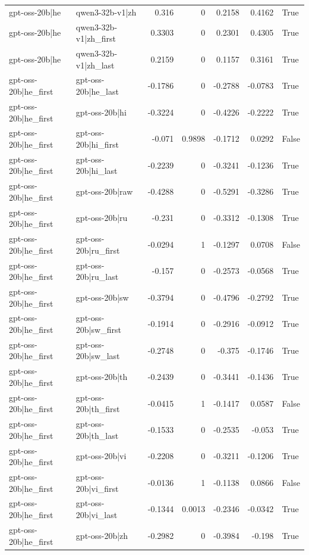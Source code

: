 \begin{table}
\begin{tabular}{l l r r r r l}
gpt-oss-20b|he & qwen3-32b-v1|zh & 0.316 & 0 & 0.2158 & 0.4162 & True \\
gpt-oss-20b|he & qwen3-32b-v1|zh_first & 0.3303 & 0 & 0.2301 & 0.4305 & True \\
gpt-oss-20b|he & qwen3-32b-v1|zh_last & 0.2159 & 0 & 0.1157 & 0.3161 & True \\
gpt-oss-20b|he_first & gpt-oss-20b|he_last & -0.1786 & 0 & -0.2788 & -0.0783 & True \\
gpt-oss-20b|he_first & gpt-oss-20b|hi & -0.3224 & 0 & -0.4226 & -0.2222 & True \\
gpt-oss-20b|he_first & gpt-oss-20b|hi_first & -0.071 & 0.9898 & -0.1712 & 0.0292 & False \\
gpt-oss-20b|he_first & gpt-oss-20b|hi_last & -0.2239 & 0 & -0.3241 & -0.1236 & True \\
gpt-oss-20b|he_first & gpt-oss-20b|raw & -0.4288 & 0 & -0.5291 & -0.3286 & True \\
gpt-oss-20b|he_first & gpt-oss-20b|ru & -0.231 & 0 & -0.3312 & -0.1308 & True \\
gpt-oss-20b|he_first & gpt-oss-20b|ru_first & -0.0294 & 1 & -0.1297 & 0.0708 & False \\
gpt-oss-20b|he_first & gpt-oss-20b|ru_last & -0.157 & 0 & -0.2573 & -0.0568 & True \\
gpt-oss-20b|he_first & gpt-oss-20b|sw & -0.3794 & 0 & -0.4796 & -0.2792 & True \\
gpt-oss-20b|he_first & gpt-oss-20b|sw_first & -0.1914 & 0 & -0.2916 & -0.0912 & True \\
gpt-oss-20b|he_first & gpt-oss-20b|sw_last & -0.2748 & 0 & -0.375 & -0.1746 & True \\
gpt-oss-20b|he_first & gpt-oss-20b|th & -0.2439 & 0 & -0.3441 & -0.1436 & True \\
gpt-oss-20b|he_first & gpt-oss-20b|th_first & -0.0415 & 1 & -0.1417 & 0.0587 & False \\
gpt-oss-20b|he_first & gpt-oss-20b|th_last & -0.1533 & 0 & -0.2535 & -0.053 & True \\
gpt-oss-20b|he_first & gpt-oss-20b|vi & -0.2208 & 0 & -0.3211 & -0.1206 & True \\
gpt-oss-20b|he_first & gpt-oss-20b|vi_first & -0.0136 & 1 & -0.1138 & 0.0866 & False \\
gpt-oss-20b|he_first & gpt-oss-20b|vi_last & -0.1344 & 0.0013 & -0.2346 & -0.0342 & True \\
gpt-oss-20b|he_first & gpt-oss-20b|zh & -0.2982 & 0 & -0.3984 & -0.198 & True \\

\end{tabular}
\end{table}
